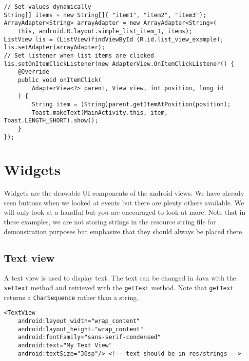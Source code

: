 \begin{lstlisting}[style=A_Java, caption={Dynamic list}, label = {listing:dynlis}]
// Set values dynamically
String[] items = new String[]{ "item1", "item2", "item3"};
ArrayAdapter<String> arrayAdapter = new ArrayAdapter<String>(
    this, android.R.layout.simple_list_item_1, items);
ListView lis = (ListView)findViewById (R.id.list_view_example);
lis.setAdapter(arrayAdapter);
// Set listener when list items are clicked
lis.setOnItemClickListener(new AdapterView.OnItemClickListener() {
    @Override
    public void onItemClick(
        AdapterView<?> parent, View view, int position, long id
    ) {
        String item = (String)parent.getItemAtPosition(position);
        Toast.makeText(MainActivity.this, item, Toast.LENGTH_SHORT).show();
    }
});

\end{lstlisting}

\section{Widgets}
Widgets are the drawable UI components of the android views. We have already seen buttons when we looked at events but there are plenty others available. We will only look at a handful but you are encouraged to look at more. Note that in these examples, we are not storing strings in the resource string file for demonstration purposes but emphasize that they should always be placed there.

\subsection{Text view}
A text view is used to display text. The text can be changed in Java with the \texttt{setText} method and retrieved with the \texttt{getText} method. Note that \texttt{getText} returns a \texttt{CharSequence} rather than a string.
\begin{lstlisting}[style=A_XML, caption={Text view declaration}, label = {listing:dectext}]
<TextView
    android:layout_width="wrap_content"
    android:layout_height="wrap_content"
    android:fontFamily="sans-serif-condensed"
    android:text="My Text View"
    android:textSize="30sp"/> <!-- text should be in res/strings -->
\end{lstlisting}

